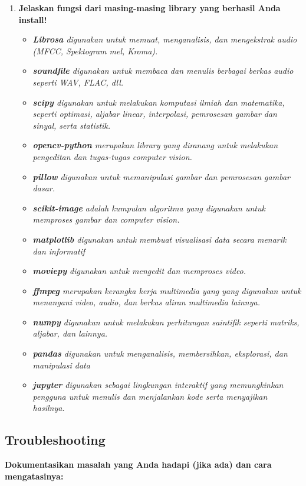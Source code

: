 \documentclass[11pt,a4paper]{article}
\begin{document}
\begin{enumerate}
    \item \textbf{Jelaskan fungsi dari masing-masing library yang berhasil Anda install!}
    \begin{itemize}
        \item \textit{\textbf{Librosa} digunakan untuk memuat, menganalisis, dan mengekstrak audio (MFCC, Spektogram mel, Kroma).}
        \item \textit{\textbf{soundfile} digunakan untuk membaca dan menulis berbagai berkas audio seperti WAV, FLAC, dll.}
        \item \textit{\textbf{scipy} digunakan untuk melakukan komputasi ilmiah dan matematika, seperti optimasi, aljabar linear, interpolasi, pemrosesan gambar dan sinyal, serta statistik.}
        \item \textit{\textbf{opencv-python} merupakan library yang diranang untuk melakukan pengeditan dan tugas-tugas computer vision.}
        \item \textit{\textbf{pillow} digunakan untuk memanipulasi gambar dan pemrosesan gambar dasar.}
        \item \textit{\textbf{scikit-image} adalah kumpulan algoritma yang digunakan untuk memproses gambar dan computer vision.}
        \item \textit{\textbf{matplotlib} digunakan untuk membuat visualisasi data secara menarik dan informatif}
        \item \textit{\textbf{moviepy} digunakan untuk mengedit dan memproses video.}
        \item \textit{\textbf{ffmpeg} merupakan kerangka kerja multimedia yang yang digunakan untuk menangani video, audio, dan berkas aliran multimedia lainnya.}
        \item \textit{\textbf{numpy} digunakan untuk melakukan perhitungan saintifik seperti matriks, aljabar, dan lainnya.}
        \item \textit{\textbf{pandas} digunakan untuk menganalisis, membersihkan, eksplorasi, dan manipulasi data }
        \item \textit{\textbf{jupyter} digunakan sebagai lingkungan interaktif yang memungkinkan pengguna untuk menulis dan menjalankan kode serta menyajikan hasilnya.}
    \end{itemize}
\end{enumerate}

\subsection{Troubleshooting}
\textbf{Dokumentasikan masalah yang Anda hadapi (jika ada) dan cara mengatasinya:}
\end{document}
